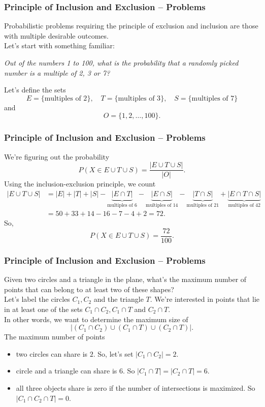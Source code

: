 \documentclass[aspectratio=169,11pt,usenames,dvipsnames,handout]{beamer}
\begin{document}
\begin{frame}
 \frametitle{Principle of Inclusion and Exclusion -- Problems}
 Probabilistic problems requiring the \alert{principle of exclusion and
 inclusion} are those with multiple desirable outcomes.\pause\\
 Let's start with something familiar:
 \begin{center}
  \emph{Out of the numbers 1 to 100, what is the probability that a randomly
  picked number is a multiple of 2, 3 or 7?}
 \end{center}
 \pause
 Let's define the sets
 \[
  E = \{\text{multiples of 2}\}, \quad T = \{\text{multiples of 3}\}, \quad S =
  \{\text{multiples of 7}\}
 \]
 \pause
 and
 \[
  O = \{1,2,\ldots,100\}.
 \]
\end{frame}

\begin{frame}
 \frametitle{Principle of Inclusion and Exclusion -- Problems}
 We're figuring out the probability
 \[
  P(X \in E \cup T \cup S) = \frac{|E \cup T \cup S|}{|O|}.
 \]
 \pause
 Using the \alert{inclusion-exclusion principle}, we count
 \begin{align*}
  |E \cup T \cup S| &= |E| + |T| + |S| - \underbrace{|E \cap
  T|}_{\text{multiples of $6$}} - \underbrace{|E \cap S|}_{\text{multiples of
  $14$}} - \underbrace{|T \cap S|}_{\text{multiples of $21$}} + \underbrace{|E \cap T \cap
  S|}_{\text{multiples of $42$}} \\
                    &= 50 + 33 + 14 - 16 - 7 - 4 + 2 = 72.
 \end{align*}
 \pause
 So,
 \[
  P(X \in E \cup T \cup S) = \frac{72}{100}.
 \]
\end{frame}

\begin{frame}
 \frametitle{Principle of Inclusion and Exclusion -- Problems}
 Given two circles and a triangle in the plane, what's the maximum number of
 points that can belong to at least two of these shapes?\pause\\
 Let's label the circles $C_1,C_2$ and the triangle $T$. \pause
 We're interested in points that lie in \alert{at least one} of the sets $C_1
 \cap C_2, C_1 \cap T$ and $C_2 \cap T$.\pause\\
 In other words, we want to determine the maximum size of
 \[
  |(C_1 \cap C_2) \cup (C_1 \cap T) \cup (C_2 \cap T)|.
 \]
 \pause
 The maximum number of points
 \begin{itemize}
  \item two circles can share is $2$. So, let's set $|C_1 \cap C_2| = 2$.
  \pause
  \item circle and a triangle can share is $6$. So $|C_1 \cap T| = |C_2 \cap T|
   = 6$.
  \pause
  \item all three objects share is zero if the number of intersections is
   maximized. So $|C_1 \cap C_2 \cap T| = 0$.
 \end{itemize}
\end{frame}
\end{document}
